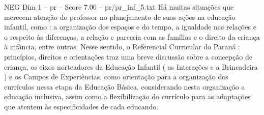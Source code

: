 \begin{textsample}{NEG Dim 1 – pr – Score 7.00 – pr/pr\_inf\_5.txt}
Há muitas situações que merecem atenção do professor no planejamento de suas ações na educação infantil, como : a organização dos espaços e do tempo, a igualdade nas relações e o respeito às diferenças, a relação e parceria com as famílias e o direito da criança à infância, entre outras.
Nesse sentido, o Referencial Curricular do Paraná : princípios, direitos e orientações traz uma breve discussão sobre a concepção de criança, os eixos norteadores da Educação Infantil ( as Interações e a Brincadeira ) e os Campos de Experiências, como orientação para a organização dos currículos nessa etapa da Educação Básica, considerando nesta organização a educação inclusiva, assim como a flexibilização do currículo para as adaptações que atentem às especificidades de cada educando.

\end{textsample}
